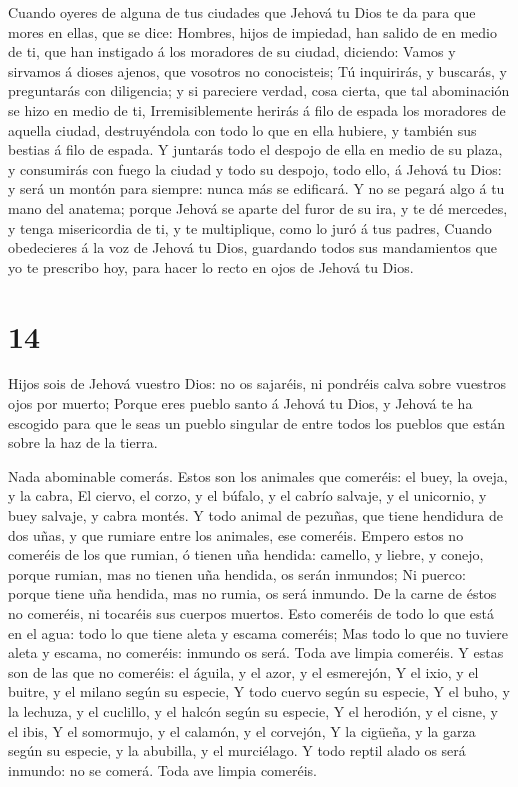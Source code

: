 Cuando oyeres de alguna de tus ciudades que Jehová tu Dios
te da para que mores en ellas, que se dice:  Hombres, hijos
de impiedad, han salido de en medio de ti, que han instigado á los
moradores de su ciudad, diciendo: Vamos y sirvamos á dioses ajenos, que
vosotros no conocisteis;  Tú inquirirás, y buscarás, y
preguntarás con diligencia; y si pareciere verdad, cosa cierta, que tal
abominación se hizo en medio de ti,  Irremisiblemente
herirás á filo de espada los moradores de aquella ciudad, destruyéndola
con todo lo que en ella hubiere, y también sus bestias á filo de espada.
 Y juntarás todo el despojo de ella en medio de su plaza, y
consumirás con fuego la ciudad y todo su despojo, todo ello, á Jehová tu
Dios: y será un montón para siempre: nunca más se edificará.
 Y no se pegará algo á tu mano del anatema; porque Jehová
se aparte del furor de su ira, y te dé mercedes, y tenga misericordia de
ti, y te multiplique, como lo juró á tus padres,  Cuando
obedecieres á la voz de Jehová tu Dios, guardando todos sus mandamientos
que yo te prescribo hoy, para hacer lo recto en ojos de Jehová tu Dios.

\hypertarget{section-13}{%
\section{14}\label{section-13}}

 Hijos sois de Jehová vuestro Dios: no os sajaréis, ni
pondréis calva sobre vuestros ojos por muerto;  Porque eres
pueblo santo á Jehová tu Dios, y Jehová te ha escogido para que le seas
un pueblo singular de entre todos los pueblos que están sobre la haz de
la tierra.

 Nada abominable comerás.  Estos son los
animales que comeréis: el buey, la oveja, y la cabra,  El
ciervo, el corzo, y el búfalo, y el cabrío salvaje, y el unicornio, y
buey salvaje, y cabra montés.  Y todo animal de pezuñas, que
tiene hendidura de dos uñas, y que rumiare entre los animales, ese
comeréis.  Empero estos no comeréis de los que rumian, ó
tienen uña hendida: camello, y liebre, y conejo, porque rumian, mas no
tienen uña hendida, os serán inmundos;  Ni puerco: porque
tiene uña hendida, mas no rumia, os será inmundo. De la carne de éstos
no comeréis, ni tocaréis sus cuerpos muertos.  Esto comeréis
de todo lo que está en el agua: todo lo que tiene aleta y escama
comeréis;  Mas todo lo que no tuviere aleta y escama, no
comeréis: inmundo os será.  Toda ave limpia comeréis.
 Y estas son de las que no comeréis: el águila, y el azor,
y el esmerejón,  Y el ixio, y el buitre, y el milano según
su especie,  Y todo cuervo según su especie, 
Y el buho, y la lechuza, y el cuclillo, y el halcón según su especie,
 Y el herodión, y el cisne, y el ibis,  Y el
somormujo, y el calamón, y el corvejón,  Y la cigüeña, y la
garza según su especie, y la abubilla, y el murciélago.  Y
todo reptil alado os será inmundo: no se comerá.  Toda ave
limpia comeréis.

